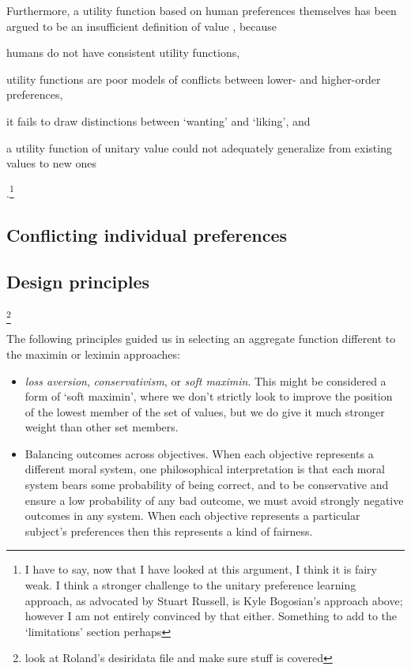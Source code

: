 Furthermore, a utility function based on human preferences themselves has been argued to be an insufficient definition of value \cite{sotala2016defining, DBLP:journals/corr/abs-1712-05812}, because \begin{enumerate*}
    \item humans do not have consistent utility functions,
    \item utility functions are poor models of conflicts between lower- and higher-order preferences,
    \item it fails to draw distinctions between `wanting' and `liking', and
    \item a utility function of unitary value could not adequately generalize from existing values to new ones
\end{enumerate*}.\footnote{I have to say, now that I have looked at this argument, I think it is fairy weak. I think a stronger challenge to the unitary preference learning approach, as advocated by Stuart Russell, is Kyle Bogosian's approach above; however I am not entirely convinced by that either. Something to add to the `limitations' section perhaps}


\subsection{Conflicting individual preferences}

\subsection{Design principles}\footnote{look at Roland's desiridata file and make sure stuff is covered}

The following principles guided us in selecting an aggregate function different to the maximin or leximin approaches:
\begin{itemize}
    \item \textit{loss aversion}, \textit{conservativism}, or \textit{soft maximin}. This might be considered a form of `soft maximin', where we don't strictly look to improve the position of the lowest member of the set of values, but we do give it much stronger weight than other set members.
    \item Balancing outcomes across objectives. When each objective represents a different moral system, one philosophical interpretation is that each moral system bears some probability of being correct, and to be conservative and ensure a low probability of any bad outcome, we must avoid strongly negative outcomes in any system. When each objective represents a particular subject's preferences then this represents a kind of fairness.
\end{itemize}

